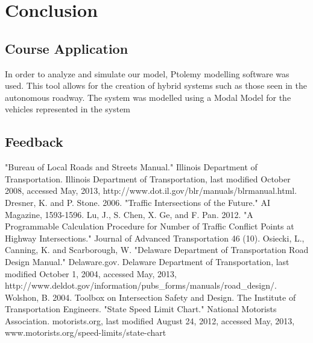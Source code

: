\documentclass[10pt]{article}
\begin{document}
\section{Conclusion}

\subsection{Course Application}
In order to analyze and simulate our model, Ptolemy modelling software was used.  This tool allows for the creation of hybrid systems such as those seen in the autonomous roadway.  The system was modelled using a Modal Model for the vehicles represented in the system

\subsection{Feedback}


\begin{thebibliography}{100}
 "Bureau of Local Roads and Streets Manual." Illinois Department of Transportation. Illinois Department of Transportation, last modified October 2008, accessed May, 2013, http://www.dot.il.gov/blr/manuals/blrmanual.html.
 Dresner, K. and P. Stone. 2006. "Traffic Intersections of the Future." AI Magazine, 1593-1596.
 Lu, J., S. Chen, X. Ge, and F. Pan. 2012. "A Programmable Calculation Procedure for Number of Traffic Conflict Points at Highway Intersections." Journal of Advanced Transportation 46 (10).
 Osiecki, L., Canning, K. and Scarborough, W. "Delaware Department of Transportation Road Design Manual." Delaware.gov. Delaware Department of Transportation, last modified October 1, 2004, accessed May, 2013, http://www.deldot.gov/information/pubs\_forms/manuals/road\_design/.
 Wolshon, B. 2004. Toolbox on Intersection Safety and Design. The Institute of Transportation Engineers.
 "State Speed Limit Chart." National Motorists Association. motorists.org, last modified August 24, 2012, accessed May, 2013, www.motorists.org/speed-limits/state-chart
\end{thebibliography}
\end{document}
